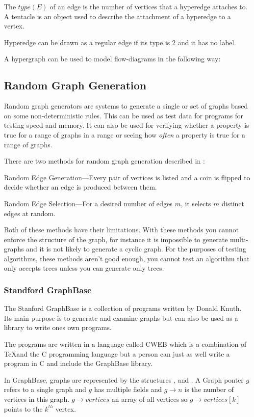   The $type(E)$ of an edge is the number of vertices that a hyperedge attaches to. A tentacle is an object used to describe the attachment of a hyperedge to a vertex.

  Hyperedge can be drawn as a regular edge if its type is 2 and it has no label.

  A hypergraph can be used to model flow-diagrams in the following way:
  

\subsection{Random Graph Generation}
  Random graph generators are systems to generate a single or set of graphs based on some non-deterministic rules. This can be used as test data for programs for testing speed and memory. It can also be used for verifying whether a property is true for a range of graphs in a range or seeing how \emph{often} a property is true for a range of graphs.

  There are two methods for random graph generation described in \cite{Skiena}:

  Random Edge Generation---Every pair of vertices is listed and a coin is flipped to decide whether an edge is produced between them.

  Random Edge Selection---For a desired number of edges $m$, it selects $m$ distinct edges at random.

  Both of these methods have their limitations. With these methods you cannot enforce the structure of the graph, for instance it is impossible to generate multi-graphs and it is not likely to generate a cyclic graph. For the purposes of testing algorithms, these methods aren't good enough, you cannot test an algorithm that only accepts trees unless you can generate only trees.

  \subsubsection{Standford GraphBase}
    The Stanford GraphBase is a collection of programs written by Donald Knuth. Its main purpose is to generate and examine graphs but can also be used as a library to write ones own programs. 

    The programs are written in a language called CWEB which is a combination of \TeX and the C programming language but a person can just as well write a program in C and include the GraphBase library. 

    In GraphBase, graphs are represented by the structures ,  and . A Graph ponter $g$ refers to a single graph and $g$ has multiple fields and $g \to n$ is the number of vertices in this graph. $g \to vertices$ an array of all vertices so $g \to vertices[k]$ points to the $k^{th}$ vertex.

